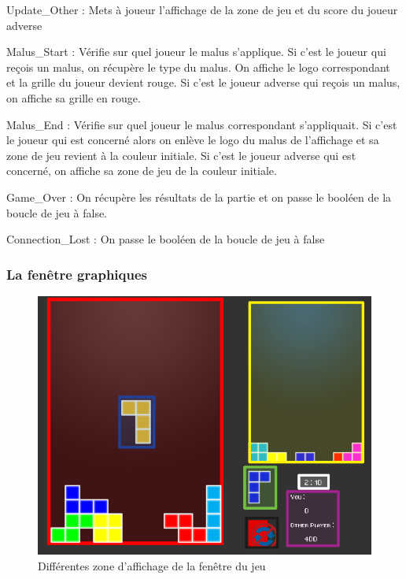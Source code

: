 \documentclass[a4paper, 12pt]{article}
\begin{document}
		Update\_Other :
		    Mets à joueur l’affichage de la zone de jeu et du score du joueur adverse

		Malus\_Start : 
		    Vérifie sur quel joueur le malus s’applique.
		    Si c’est le joueur qui reçois un malus, on récupère le type du malus. On affiche le logo correspondant et la grille du joueur devient rouge.
		    Si c’est le joueur adverse qui reçois un malus, on affiche sa grille en rouge.

		Malus\_End :
		    Vérifie sur quel joueur le malus correspondant s’appliquait.
		    Si c’est le joueur qui est concerné alors on enlève le logo du malus de l’affichage et sa zone de jeu revient à la couleur initiale.
		    Si c’est le joueur adverse qui est concerné, on affiche sa zone de jeu de la couleur initiale.

		Game\_Over :
		    On récupère les résultats de la partie et on passe le booléen de la boucle de jeu à false.

		Connection\_Lost : 
		    On passe le booléen de la boucle de jeu à false
		    

		\subsubsection{La fenêtre graphiques}

			\begin{figure}[bt]
				\centering
				\includegraphics[scale=0.35]{img/fenetre.png}
				\caption{Différentes zone d'affichage de la fenêtre du jeu}
				\label{fig:fen}
			\end{figure}
\end{document}
